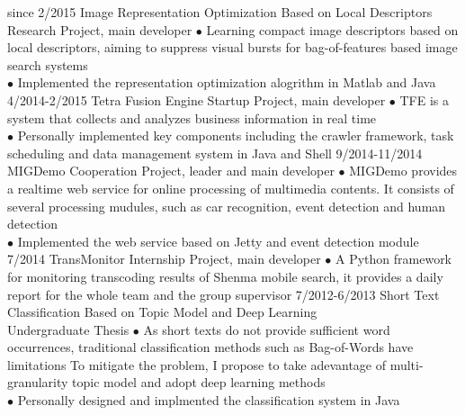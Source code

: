 \documentclass[]{friggeri-cv}
\begin{document}
\begin{entrylist}
  \entry
    {since 2/2015}
    {Image Representation Optimization Based on Local Descriptors \\ }
    {Research Project, main developer}
    {$\bullet$ Learning compact image descriptors based on local descriptors, aiming to suppress visual bursts for bag-of-features based image search systems \\
    $\bullet$ Implemented the representation optimization alogrithm in Matlab and Java}
  \entry
    {4/2014-2/2015}
    {Tetra Fusion Engine}
    {Startup Project, main developer}
    {$\bullet$ TFE is a system that collects and analyzes business information in real time \\
    $\bullet$ Personally implemented key components including the crawler framework, task scheduling and data management system in Java and Shell}
  \entry
    {9/2014-11/2014}
    {MIGDemo}
    {Cooperation Project, leader and main developer}
    {$\bullet$ MIGDemo provides a realtime web service for online processing of multimedia contents. It consists of several processing mudules, such as car recognition, event detection and human detection\\
    $\bullet$ Implemented the web service based on Jetty and event detection module}
  \entry
    {7/2014}
    {TransMonitor}
    {Internship Project, main developer}
    {$\bullet$ A Python framework for monitoring transcoding results of Shenma mobile search, it provides a daily report for the whole team and the group supervisor }
  \entry
    {7/2012-6/2013}
    {Short Text Classification Based on Topic Model and Deep Learning \\ }
    {Undergraduate Thesis}
    {$\bullet$ As short texts do not provide sufficient word occurrences, traditional classification methods such as Bag-of-Words have limitations
    To mitigate the problem, I propose to take adevantage of multi-granularity topic model and adopt deep learning methods \\
    $\bullet$ Personally designed and implmented the classification system in Java}
\end{entrylist}
\end{document}
